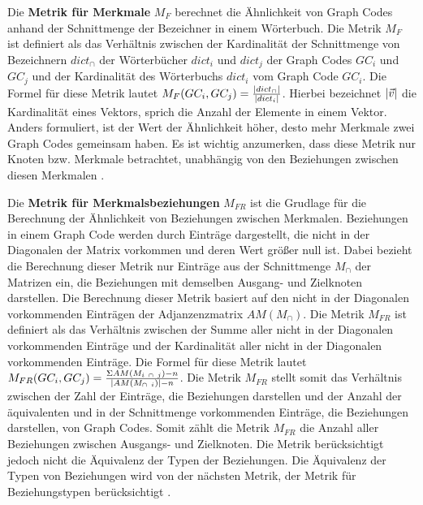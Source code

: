 
Die \textbf{Metrik für Merkmale} $M_F$ berechnet die Ähnlichkeit von Graph Codes anhand der Schnittmenge der Bezeichner in einem Wörterbuch.
Die Metrik $M_F$ ist definiert als das Verhältnis zwischen der Kardinalität der Schnittmenge von Bezeichnern $dict_{\cap}$ der Wörterbücher $dict_i$ und $dict_j$ der Graph Codes $GC_i$ und $GC_j$ und der Kardinalität des Wörterbuchs $dict_i$ vom Graph Code $GC_i$.
Die Formel für diese Metrik lautet $M_F(GC_i, GC_j) = \frac{\abs{dict_{\cap}}}{\abs{dict_i}}$.
Hierbei bezeichnet $\abs{\Vec{v}}$ die Kardinalität eines Vektors, sprich die Anzahl der Elemente in einem Vektor.
Anders formuliert, ist der Wert der Ähnlichkeit höher, desto mehr Merkmale zwei Graph Codes gemeinsam haben.
Es ist wichtig anzumerken, dass diese Metrik nur Knoten bzw. Merkmale betrachtet, unabhängig von den Beziehungen zwischen diesen Merkmalen \cite{gc-2d-proj-mmfg}.

Die \textbf{Metrik für Merkmalsbeziehungen} $M_{FR}$ ist die Grudlage für die Berechnung der Ähnlichkeit von Beziehungen zwischen Merkmalen.
Beziehungen in einem Graph Code werden durch Einträge dargestellt, die nicht in der Diagonalen der Matrix vorkommen und deren Wert größer null ist.
Dabei bezieht die Berechnung dieser Metrik nur Einträge aus der Schnittmenge $M_{\cap}$ der Matrizen ein, die Beziehungen mit demselben Ausgang- und Zielknoten darstellen.
Die Berechnung dieser Metrik basiert auf den nicht in der Diagonalen vorkommenden Einträgen der Adjanzenzmatrix $AM(M_{\cap})$.
Die Metrik $M_{FR}$ ist definiert als das Verhältnis zwischen der Summe aller nicht in der Diagonalen vorkommenden Einträge und der Kardinalität aller nicht in der Diagonalen vorkommenden Einträge.
Die Formel für diese Metrik lautet $M_{FR}(GC_i, GC_j) = \frac{\Sigma AM(M_{i~\cap~j}) -n}{\abs{AM(M_{\cap~i})} - n}$.
Die Metrik $M_{FR}$ stellt somit das Verhältnis zwischen der Zahl der Einträge, die Beziehungen darstellen und der Anzahl der äquivalenten und in der Schnittmenge vorkommenden Einträge, die Beziehungen darstellen, von Graph Codes.
Somit zählt die Metrik $M_{FR}$ die Anzahl aller Beziehungen zwischen Ausgangs- und Zielknoten. 
Die Metrik berücksichtigt jedoch nicht die Äquivalenz der Typen der Beziehungen.
Die Äquivalenz der Typen von Beziehungen wird von der nächsten Metrik, der Metrik für Beziehungstypen berücksichtigt \cite{gc-2d-proj-mmfg}.

